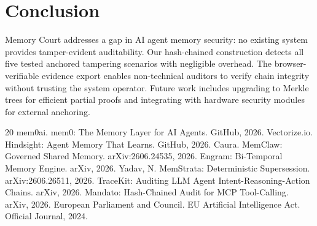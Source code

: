 \documentclass[sigconf,nonacm]{acmart}
\begin{document}
\section{Conclusion}
Memory Court addresses a gap in AI agent memory security: no existing system provides tamper-evident auditability. Our hash-chained construction detects all five tested anchored tampering scenarios with negligible overhead. The browser-verifiable evidence export enables non-technical auditors to verify chain integrity without trusting the system operator. Future work includes upgrading to Merkle trees for efficient partial proofs and integrating with hardware security modules for external anchoring.

\begin{thebibliography}{20}
 mem0ai. mem0: The Memory Layer for AI Agents. GitHub, 2026.
 Vectorize.io. Hindsight: Agent Memory That Learns. GitHub, 2026.
 Caura. MemClaw: Governed Shared Memory. arXiv:2606.24535, 2026.
 Engram: Bi-Temporal Memory Engine. arXiv, 2026.
 Yadav, N. MemStrata: Deterministic Supersession. arXiv:2606.26511, 2026.
 TraceKit: Auditing LLM Agent Intent-Reasoning-Action Chains. arXiv, 2026.
 Mandato: Hash-Chained Audit for MCP Tool-Calling. arXiv, 2026.
 European Parliament and Council. EU Artificial Intelligence Act. Official Journal, 2024.
\end{thebibliography}
\end{document}
